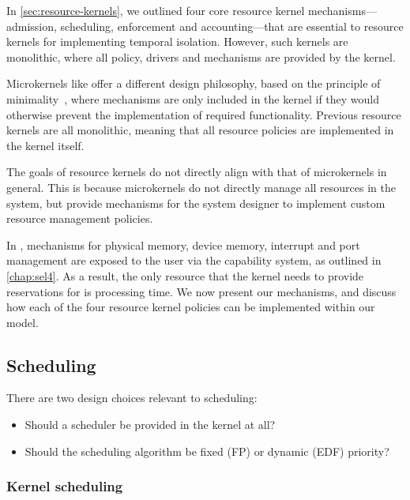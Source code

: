 In \cref{sec:resource-kernels}, we outlined four core resource kernel mechanisms---admission, scheduling, enforcement and
accounting---that are essential to resource kernels for implementing temporal isolation.  However,
such kernels are monolithic, where all policy, drivers and
mechanisms are provided by the kernel.

Microkernels like \selfour offer a different design philosophy, based on the principle of
minimality~\citep{Liedtke_95}, where mechanisms are only included in the kernel if they would
otherwise prevent the implementation of required functionality. Previous resource kernels
are all monolithic, meaning that all resource policies are implemented in the kernel itself.

The goals of resource kernels do not directly align with that of microkernels in general.  This is
because microkernels do not directly manage all resources in the system, but provide mechanisms for
the system designer to implement custom resource management policies.  

In \selfour, mechanisms for physical memory, device memory, interrupt and \IO port management are
exposed to the user via the capability system, as outlined in \cref{chap:sel4}. As a result, the
only resource that the kernel needs to provide reservations for is processing time.  We now present
our mechanisms, and discuss how each of the four resource kernel policies can be implemented within our model.

\subsection{Scheduling}
\label{sec:model-scheduling}

There are two design choices relevant to scheduling:

\begin{itemize} 
    \item Should a scheduler be provided in the kernel at all? 
    \item Should the scheduling algorithm be fixed (\gls{FP}) or dynamic (\gls{EDF}) priority?
\end{itemize}

\subsubsection{Kernel scheduling}

